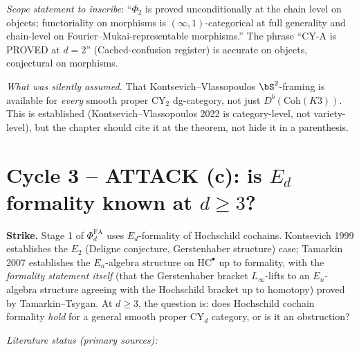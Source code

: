 \documentclass[11pt]{article}
\theoremstyle{definition}
\providecommand{\PhiFA}{\Phi^{\mathrm{FA}}}
\providecommand{\Coh}{\mathrm{Coh}}
\begin{document}
\emph{Scope statement to inscribe}: ``$\Phi_2$ is proved
unconditionally at the chain level on objects; functoriality on
morphisms is $(\infty,1)$-categorical at full generality and
chain-level on Fourier--Mukai-representable morphisms.'' The phrase
``CY-A is PROVED at $d = 2$'' (Cached-confusion register) is accurate
on objects, conjectural on morphisms.

\emph{What was silently assumed.} That Kontsevich--Vlassopoulos
$\bS^2$-framing is available for \emph{every} smooth proper CY$_2$
dg-category, not just $D^b(\Coh(K3))$. This is established
(Kontsevich--Vlassopoulos 2022 is category-level, not variety-level),
but the chapter should cite it at the theorem, not hide it in a
parenthesis.

\section*{Cycle 3 -- ATTACK (c): is $E_d$ formality known at $d \geq 3$?}

\noindent\textbf{Strike.} Stage 1 of $\PhiFA_d$ uses $E_d$-formality of
Hochschild cochains. Kontsevich 1999 establishes the $E_2$
(Deligne conjecture, Gerstenhaber structure) case; Tamarkin 2007
establishes the $E_n$-algebra structure on $\mathrm{HC}^\bullet$ up to
formality, with the \emph{formality statement itself} (that the
Gerstenhaber bracket $L_\infty$-lifts to an $E_n$-algebra structure
agreeing with the Hochschild bracket up to homotopy) proved by
Tamarkin--Tsygan. At $d \geq 3$, the question is: does Hochschild
cochain formality \emph{hold} for a general smooth proper CY$_d$
category, or is it an obstruction?

\emph{Literature status (primary sources):}
\end{document}

